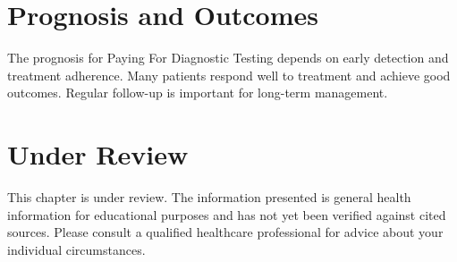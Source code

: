 \section*{Prognosis and Outcomes}
The prognosis for Paying For Diagnostic Testing depends on early detection and treatment adherence. Many patients respond well to treatment and achieve good outcomes. Regular follow-up is important for long-term management.
\section*{Under Review}
This chapter is under review. The information presented is general health information for educational purposes and has not yet been verified against cited sources. Please consult a qualified healthcare professional for advice about your individual circumstances.


\clearpage
